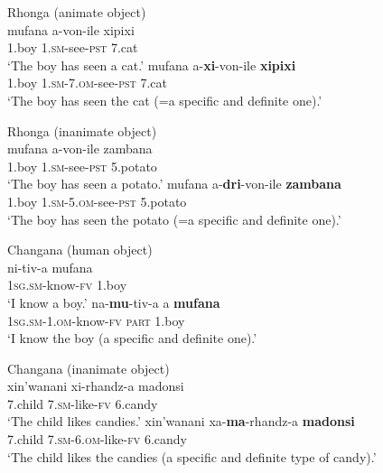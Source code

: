 \documentclass[output=paper]{langsci/langscibook}
\begin{document}
\ea\label{ex:nguna:19}
\ea
{Rhonga (animate object)}\\
\gll mufana       a-von-ile                    xipixi\\
     1.boy          1.\textsc{sm}-see-\textsc{pst }             7.cat\\
\glt ‘The boy has seen a cat.’
\ex\label{ex:nguna:}
\gll mufana        a-\textbf{xi}-von-ile                   \textbf{xipixi}\\
     1.boy           \textsc{1.sm-7.om}-see-\textsc{pst}       7.cat\\
\glt ‘The boy has seen the cat (=a specific and definite one).’
\z
\z



\ea\label{ex:nguna:20}
\ea
{Rhonga (inanimate object)}\\
\gll mufana       a-von-ile                      zambana\\
     1.boy          1.\textsc{sm}-see-\textsc{pst}                5.potato\\
\glt ‘The boy has seen a potato.’
\ex\label{ex:nguna:}
\gll mufana        a-\textbf{dri}-von-ile                \textbf{zambana}\\
     1.boy           1.\textsc{sm-5.om}-see-\textsc{pst}      5.potato\\
\glt ‘The boy has seen the potato (=a specific and definite one).’
\z
\z



\ea\label{ex:nguna:21}
\ea
{Changana (human object)}\\
\gll ni-tiv-a                           mufana\\
     \textsc{1sg.sm}-know-\textsc{fv}           1.boy\\
\glt ‘I know a boy.’
\ex\label{ex:nguna:}
\gll na-\textbf{mu}-tiv-a                            a{\rmfnm}       \textbf{mufana}\\
     \textsc{1sg.sm-1.om}-know-\textsc{fv}          \textsc{part}    1.boy\\
\glt ‘I know the boy (a specific and definite one).’
\z
\z



\ea\label{ex:nguna:22}
\ea
{Changana (inanimate object)}\\
\gll xin’wanani        xi-rhandz-a        madonsi\\
     7.child              \textsc{7.sm}-like-\textsc{fv}       6.candy\\
\glt ‘The child likes candies.’
\ex\label{ex:nguna:}
\gll xin’wanani       xa-\textbf{ma}-rhandz-a         \textbf{madonsi}\\
     7.child              \textsc{7.sm-6.om}-like-\textsc{fv}     6.candy\\
\glt ‘The child likes the candies (a specific and definite type of candy).’
\z
\z
\end{document}
